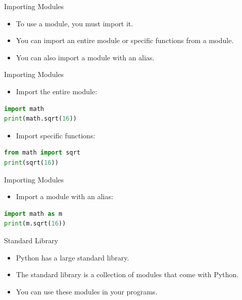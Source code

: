 \begin{frame}{Importing Modules}
    \begin{itemize}
        \item To use a module, you must import it.
        \item You can import an entire module or specific functions from a module.
        \item You can also import a module with an alias.
    \end{itemize}
\end{frame} 


\begin{frame}[fragile]{Importing Modules}
    \begin{itemize}
        \item Import the entire module:
    \end{itemize}

    \begin{lstlisting}[language=Python]
import math
print(math.sqrt(16))
    \end{lstlisting}

    \begin{itemize}
        \item Import specific functions:
    \end{itemize}

    \begin{lstlisting}[language=Python]
from math import sqrt
print(sqrt(16))
    \end{lstlisting}
\end{frame}     


\begin{frame}[fragile]{Importing Modules}
    \begin{itemize}
        \item Import a module with an alias:
    \end{itemize}

    \begin{lstlisting}[language=Python]
import math as m        
print(m.sqrt(16))
    \end{lstlisting}
\end{frame}

\begin{frame}{Standard Library}
    \begin{itemize}
        \item Python has a large standard library.
        \item The standard library is a collection of modules that come with Python.
        \item You can use these modules in your programs.
    \end{itemize}
\end{frame}

